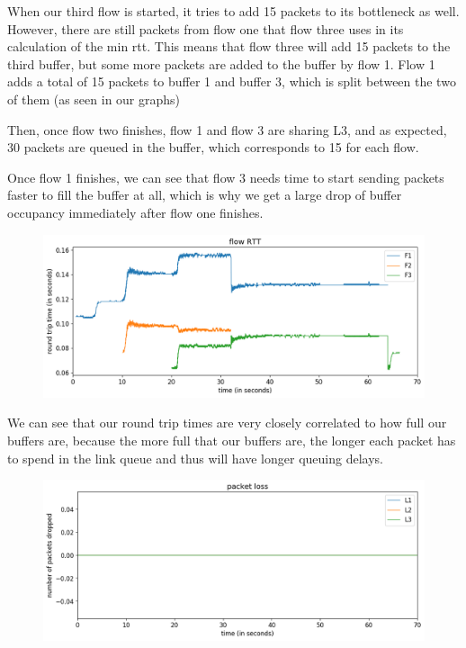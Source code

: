 \documentclass{article}
\begin{document}
When our third flow is started, it tries to add 15 packets to its bottleneck as well. However, there are still packets from flow one that flow three uses in its calculation of the min rtt. This means that flow three will add 15 packets to the third buffer, but some more packets are added to the buffer by flow 1. Flow 1 adds a total of 15 packets to buffer 1 and buffer 3, which is split between the two of them (as seen in our graphs)

Then, once flow two finishes, flow 1 and flow 3 are sharing L3, and as expected, 30 packets are queued in the buffer, which corresponds to 15 for each flow.

Once flow 1 finishes, we can see that flow 3 needs time to start sending packets faster to fill the buffer at all, which is why we get a large drop of buffer occupancy immediately after flow one finishes.

\begin{figure}[H]
\centering
\includegraphics[width = \textwidth]{test_case2_fast flow RTT.png}
\end{figure}

We can see that our round trip times are very closely correlated to how full our buffers are, because the more full that our buffers are, the longer each packet has to spend in the link queue and thus will have longer queuing delays.

\begin{figure}[H]
\centering
\includegraphics[width = \textwidth]{test_case2_fast packet loss.png}
\end{figure}
\end{document}

